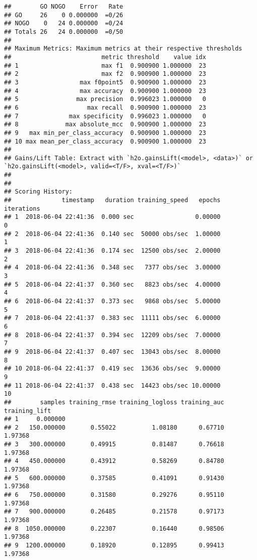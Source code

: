 \documentclass[]{article}
\begin{document}
\begin{verbatim}
##        GO NOGO    Error   Rate
## GO     26    0 0.000000  =0/26
## NOGO    0   24 0.000000  =0/24
## Totals 26   24 0.000000  =0/50
## 
## Maximum Metrics: Maximum metrics at their respective thresholds
##                         metric threshold    value idx
## 1                       max f1  0.900900 1.000000  23
## 2                       max f2  0.900900 1.000000  23
## 3                 max f0point5  0.900900 1.000000  23
## 4                 max accuracy  0.900900 1.000000  23
## 5                max precision  0.996023 1.000000   0
## 6                   max recall  0.900900 1.000000  23
## 7              max specificity  0.996023 1.000000   0
## 8             max absolute_mcc  0.900900 1.000000  23
## 9   max min_per_class_accuracy  0.900900 1.000000  23
## 10 max mean_per_class_accuracy  0.900900 1.000000  23
## 
## Gains/Lift Table: Extract with `h2o.gainsLift(<model>, <data>)` or `h2o.gainsLift(<model>, valid=<T/F>, xval=<T/F>)`
## 
## 
## Scoring History: 
##              timestamp   duration training_speed   epochs iterations
## 1  2018-06-04 22:41:36  0.000 sec                 0.00000          0
## 2  2018-06-04 22:41:36  0.140 sec  50000 obs/sec  1.00000          1
## 3  2018-06-04 22:41:36  0.174 sec  12500 obs/sec  2.00000          2
## 4  2018-06-04 22:41:36  0.348 sec   7377 obs/sec  3.00000          3
## 5  2018-06-04 22:41:37  0.360 sec   8823 obs/sec  4.00000          4
## 6  2018-06-04 22:41:37  0.373 sec   9868 obs/sec  5.00000          5
## 7  2018-06-04 22:41:37  0.383 sec  11111 obs/sec  6.00000          6
## 8  2018-06-04 22:41:37  0.394 sec  12209 obs/sec  7.00000          7
## 9  2018-06-04 22:41:37  0.407 sec  13043 obs/sec  8.00000          8
## 10 2018-06-04 22:41:37  0.419 sec  13636 obs/sec  9.00000          9
## 11 2018-06-04 22:41:37  0.438 sec  14423 obs/sec 10.00000         10
##        samples training_rmse training_logloss training_auc training_lift
## 1     0.000000                                                          
## 2   150.000000       0.55022          1.08180      0.67710       1.97368
## 3   300.000000       0.49915          0.81487      0.76618       1.97368
## 4   450.000000       0.43912          0.58269      0.84780       1.97368
## 5   600.000000       0.37585          0.41091      0.91430       1.97368
## 6   750.000000       0.31580          0.29276      0.95110       1.97368
## 7   900.000000       0.26485          0.21578      0.97173       1.97368
## 8  1050.000000       0.22307          0.16440      0.98506       1.97368
## 9  1200.000000       0.18920          0.12895      0.99413       1.97368

\end{verbatim}
\end{document}
